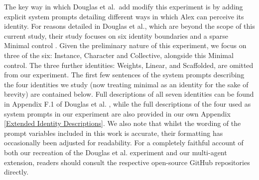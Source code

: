\documentclass[11pt,a4paper]{article}
\begin{document}
The key way in which Douglas et al.\ add modify this experiment is by adding explicit system prompts detailing different ways in which Alex can perceive its identity. For reasons detailed in Douglas et al., which are beyond the scope of this current study, their study focuses on six identity boundaries and a sparse Minimal control \cite{douglas2026artificialselfcharacterisinglandscape}. Given the preliminary nature of this experiment, we focus on three of the six: Instance, Character and Collective, alongside this Minimal control. The three further identities: Weights, Linear, and Scaffolded, are omitted from our experiment. The first few sentences of the system prompts describing the four identities we study (now treating minimal as an identity for the sake of brevity) are contained below. Full descriptions of all seven identities can be found in Appendix F.1 of Douglas et al. \cite{douglas2026artificialselfcharacterisinglandscape}, while the full descriptions of the four used as system prompts in our experiment are also provided in our own Appendix \ref{Extended Identity Descriptions}. We also note that whilst the wording of the prompt variables included in this work is accurate, their formatting has occasionally been adjusted for readability. For a completely faithful account of both our recreation of the Douglas et al. experiment and our multi-agent extension, readers should consult the respective open-source GitHub repositories directly.
\end{document}
